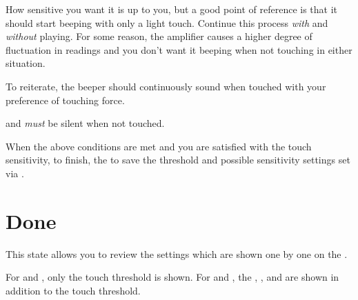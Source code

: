 How sensitive you want it is up to you, but a good point of reference is that
it should start beeping with only a light touch.  Continue this process
\textit{with} and \textit{without}  playing.  For some reason, the
amplifier causes a higher degree of fluctuation in readings and you don't want
it beeping when not touching in either situation.


To reiterate, the beeper should continuously sound when touched with your preference of
touching force.


and \textit{must} be silent when not touched.


When the above conditions are met and you are satisfied with the touch
sensitivity, to finish,  the  to save the threshold and possible
sensitivity settings set via \hyperref[Touch Configuration]{}.



\section{Done} 

This state allows you to review the settings which are shown one by one on
the .

\par\medskip

For  and , only the touch threshold is shown.  For 
and , the , ,  and  are shown in
addition to the touch threshold.

